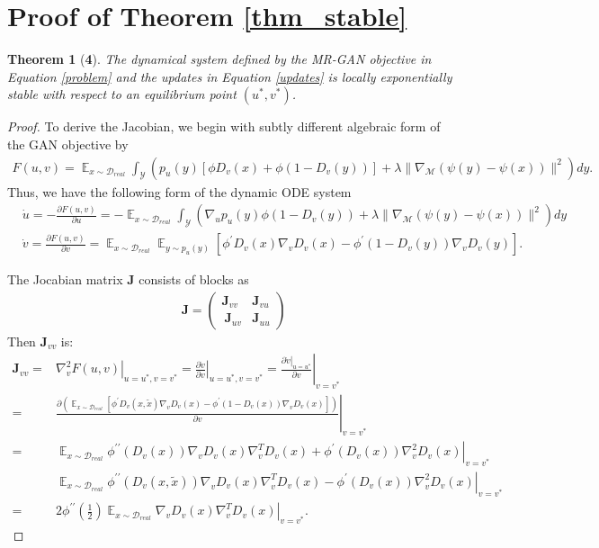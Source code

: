 \documentclass[10pt,twocolumn,letterpaper]{article}
\newcommand{\di}{{D_v}}
\newcommand{\D}{\mathcal{D}}
\newcommand{\E}{\mathbb{E}}
\newcommand{\xt}{{\tilde{x}}}
\newcommand{\M}{\mathcal{M}}
\newcommand{\J}{\mathbf{J}}
\newtheorem*{thm*}{Theorem}
\begin{document}
\section{Proof of Theorem \ref{thm_stable}}
\begin{thm*}[\bf 4]
	The dynamical system defined by the MR-GAN objective in Equation \eqref{problem} and the updates in
	Equation \eqref{updates} is locally exponentially stable with respect to an equilibrium point $(u^\ast, v^\ast)$.
\end{thm*}
\begin{proof}
	To derive the Jacobian, we begin with subtly different algebraic form of the GAN objective by 
	\begin{align}
	F(u,v)= \mathop{\E}_{x\sim \D_{real}}\int_{\mathcal{Y}}(p_u(y)[\phi \di(x)+ \phi(1-\di(y))]+\lambda \|\nabla_\M (\psi(y)-\psi(x))\|^2)dy.
	\end{align}
	Thus, we have the following form of the dynamic ODE system
	\begin{align}
	&\dot{u}=-\frac{\partial F(u,v)}{\partial u} = -\mathop{\E}_{x\sim \D_{real}}\int_{\mathcal{Y}}(\nabla_u p_u(y) \phi(1-\di(y))+\lambda \|\nabla_\M (\psi(y)-\psi(x))\|^2)dy\\
	&\dot{v} =\frac{\partial F(u,v)}{\partial v} = \mathop{\E}_{x\sim \D_{real}}\mathop{\E}_{y\sim p_u(y)}[\phi^\prime \di(x)\nabla_v
	\di(x)- \phi^\prime(1-\di(y))\nabla_v
	\di(y)].
	\end{align}
	
	The Jocabian matrix $\J$ consists of blocks as
	\begin{align}
	\J = \begin{pmatrix}
	\J_{vv} & \J_{vu}\\\
	\J_{uv} & \J_{uu}
	\end{pmatrix}
	\end{align}
	Then $\J_{vv}$ is:
	\begin{align}
	\J_{vv} =& \left.\nabla_v^2 F(u,v)\right|_{u=u^\ast,v=v^\ast}=\left.\frac{\partial \dot{v}}{\partial v}\right|_{u=u^\ast,v=v^\ast}=\left.\frac{\left.\partial \dot{v}\right|_{u=u^\ast}}{\partial v}\right|_{v=v^\ast} \\
	=&\left.\frac{\partial(\mathop{\E}_{x\sim \D_{real}}[\phi^\prime \di(x,\xt)\nabla_v
		\di(x)- \phi^\prime(1-\di(x))\nabla_v
		\di(x)])}{\partial v}\right|_{v=v^\ast}\\
	=& \left. \mathop{\E}_{x\sim \D_{real}}\phi^{\prime\prime}(\di(x)) \nabla_v\di(x)\nabla^T_v\di(x)+\phi^\prime(\di(x))\nabla^2_v\di(x)\right|_{v=v^\ast} \\
	& \left. \mathop{\E}_{x\sim \D_{real}}\phi^{\prime\prime}(\di(x,\xt)) \nabla_v\di(x)\nabla^T_v\di(x)-\phi^\prime(\di(x))\nabla^2_v\di(x)\right|_{v=v^\ast} \\
	=&2\phi^{\prime\prime}(\frac{1}{2}) \left. \mathop{\E}_{x\sim \D_{real}} \nabla_v\di(x)\nabla^T_v\di(x)\right|_{v=v^\ast}.
	\end{align}
	

\end{proof}
\end{document}
